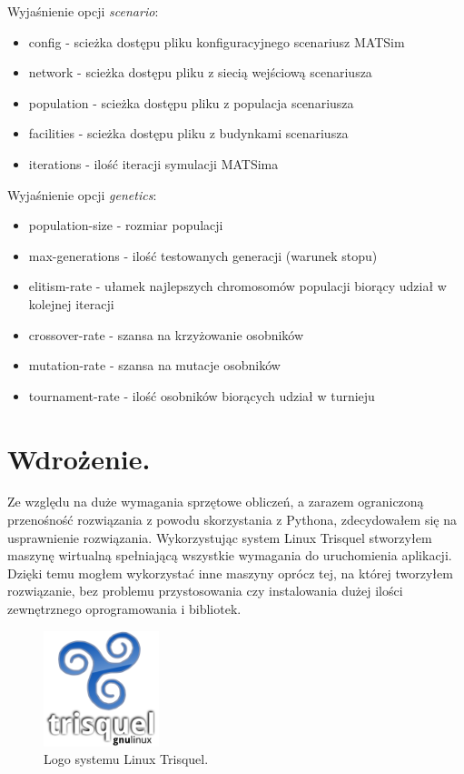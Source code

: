 \documentclass[twoside,12pt]{report}
\begin{document}
\vspace*{15px}

Wyjaśnienie opcji \textit{scenario}:
\begin{itemize}
\item config - scieżka dostępu pliku konfiguracyjnego scenariusz MATSim
\item network - scieżka dostępu pliku z siecią wejściową scenariusza
\item population - scieżka dostępu pliku z populacja scenariusza
\item facilities - scieżka dostępu pliku z budynkami scenariusza
\item iterations - ilość iteracji symulacji MATSima
\end{itemize}

\vspace*{15px}

Wyjaśnienie opcji \textit{genetics}:
\begin{itemize}
\item population-size - rozmiar populacji
\item max-generations - ilość testowanych generacji (warunek stopu)
\item elitism-rate - ułamek najlepszych chromosomów populacji biorący udział w kolejnej iteracji
\item crossover-rate - szansa na krzyżowanie osobników
\item mutation-rate - szansa na mutacje osobników
\item tournament-rate - ilość osobników biorących udział w turnieju
\end{itemize}


\section{Wdrożenie.}

Ze względu na duże wymagania sprzętowe obliczeń, a zarazem ograniczoną przenośność rozwiązania z powodu skorzystania z Pythona, zdecydowałem się na usprawnienie rozwiązania. Wykorzystując system Linux Trisquel stworzyłem maszynę wirtualną spełniającą wszystkie wymagania do uruchomienia aplikacji. Dzięki temu mogłem wykorzystać inne maszyny oprócz tej, na której tworzyłem rozwiązanie, bez problemu przystosowania czy instalowania dużej ilości zewnętrznego oprogramowania i bibliotek\cite{trisquel}.

\begin{figure}[ht]
\centering
\includegraphics[width=0.3\textwidth]{img/trisquel}
\caption{Logo systemu Linux Trisquel.}
\end{figure}
\end{document}
